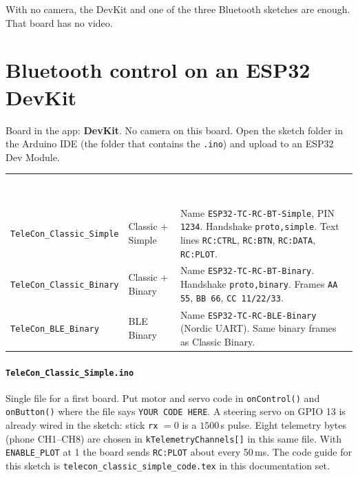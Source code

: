 \documentclass[12pt,a4paper]{article}
\newcommand{\thc}[1]{\textcolor{white}{\bfseries #1}}
\newcommand{\ui}[1]{\textsf{\textbf{#1}}}
\begin{document}
With no camera, the DevKit and one of the three Bluetooth sketches are
enough. That board has no video.

\section{Bluetooth control on an ESP32 DevKit}

Board in the app: \ui{DevKit}. No camera on this board. Open the sketch
folder in the Arduino IDE (the folder that contains the \texttt{.ino}) and
upload to an ESP32 Dev Module.

\begin{center}
\renewcommand{\arraystretch}{1.28}
\setlength{\tabcolsep}{4pt}
\begin{tabular}{>{\raggedright\arraybackslash}p{4.3cm}
                >{\raggedright\arraybackslash}p{4.6cm}
                >{\raggedright\arraybackslash}p{5.3cm}}
\rowcolor{TblHead}
\thc{ZIP / \texttt{.ino}} & \thc{Phone setting} & \thc{On the air} \\
\rowcolor{TblChan}
\texttt{TeleCon\_Classic\_Simple} & Classic + Simple & Name \texttt{ESP32-TC-RC-BT-Simple}, PIN \texttt{1234}. Handshake \texttt{proto,simple}. Text lines \texttt{RC:CTRL}, \texttt{RC:BTN}, \texttt{RC:DATA}, \texttt{RC:PLOT}. \\
\rowcolor{TblChan}
\texttt{TeleCon\_Classic\_Binary} & Classic + Binary & Name \texttt{ESP32-TC-RC-BT-Binary}. Handshake \texttt{proto,binary}. Frames \texttt{AA 55}, \texttt{BB 66}, \texttt{CC 11/22/33}. \\
\rowcolor{TblChan}
\texttt{TeleCon\_BLE\_Binary} & BLE Binary & Name \texttt{ESP32-TC-RC-BLE-Binary} (Nordic UART). Same binary frames as Classic Binary. \\
\end{tabular}
\end{center}

\paragraph{\texttt{TeleCon\_Classic\_Simple.ino}}
Single file for a first board. Put motor and servo code in
\texttt{onControl()} and \texttt{onButton()} where the file says
\texttt{YOUR CODE HERE}. A steering servo on GPIO 13 is already wired in
the sketch: stick \texttt{rx} $= 0$ is a $1500$\,\textmu s pulse. Eight
telemetry bytes (phone CH1--CH8) are chosen in
\texttt{kTelemetryChannels[]} in this same file. With \texttt{ENABLE\_PLOT}
at 1 the board sends \texttt{RC:PLOT} about every 50\,ms.
The code guide for this sketch is
\texttt{telecon\_classic\_simple\_code.tex} in this documentation set.
\end{document}
